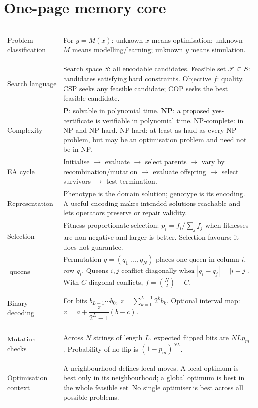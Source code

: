 \documentclass[11pt,a4paper]{article}
\begin{document}
\clearpage
\section{One-page memory core}
\begin{tabular}{@{}>{\bfseries\raggedright\arraybackslash}p{}
  >{\raggedright\arraybackslash}p{}@{}}
\toprule
Problem classification & For $y=M(x)$: unknown $x$ means optimisation; unknown $M$ means modelling/learning; unknown $y$ means simulation.\\
Search language & Search space $S$: all encodable candidates. Feasible set $\mathcal F\subseteq S$: candidates satisfying hard constraints. Objective $f$: quality. CSP seeks any feasible candidate; COP seeks the best feasible candidate.\\
Complexity & $\mathbf P$: solvable in polynomial time. $\mathbf{NP}$: a proposed yes-certificate is verifiable in polynomial time. NP-complete: in NP and NP-hard. NP-hard: at least as hard as every NP problem, but may be an optimisation problem and need not be in NP.\\
EA cycle & Initialise $\rightarrow$ evaluate $\rightarrow$ select parents $\rightarrow$ vary by recombination/mutation $\rightarrow$ evaluate offspring $\rightarrow$ select survivors $\rightarrow$ test termination.\\
Representation & Phenotype is the domain solution; genotype is its encoding. A useful encoding makes intended solutions reachable and lets operators preserve or repair validity.\\
Selection & Fitness-proportionate selection: $p_i=f_i/\sum_j f_j$ when fitnesses are non-negative and larger is better. Selection favours; it does not guarantee.\\
8-queens & Permutation $q=(q_1,\ldots,q_N)$ places one queen in column $i$, row $q_i$. Queens $i,j$ conflict diagonally when $|q_i-q_j|=|i-j|$. With $C$ diagonal conflicts, $f=\binom N2-C$.\\
Binary decoding & For bits $b_{L-1}\cdots b_0$, $z=\sum_{k=0}^{L-1}2^k b_k$. Optional interval map: $x=a+\dfrac{z}{2^L-1}(b-a)$.\\
Mutation checks & Across $N$ strings of length $L$, expected flipped bits are $NLp_m$. Probability of no flip is $(1-p_m)^{NL}$.\\
Optimisation context & A neighbourhood defines local moves. A local optimum is best only in its neighbourhood; a global optimum is best in the whole feasible set. No single optimiser is best across all possible problems.\\

\end{tabular}
\end{document}
